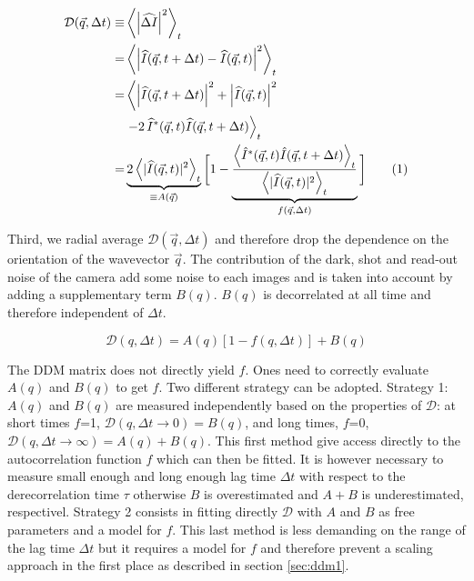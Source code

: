 \documentclass[prb,twocolumn,amsmath,amssymb]{revtex4-1}
\newcommand{\tgn}[1]{{\color{blue}#1}} %
\begin{document}
{%
\begin{align*}
\mathcal{D}(\vec{q},\Delta t) \equiv& \left\langle \left|\widehat{\Delta I}\right|^2 \right\rangle_t\\
 =& \left\langle \left|\widehat{I}(\vec{q},t+\Delta t) - \widehat{I}(\vec{q},t)\right|^2 \right\rangle_t \\
=& \left\langle \left|\widehat{I}(\vec{q},t+ \Delta t)\right|^2 + \left|\widehat{I}(\vec{q},t)\right|^2\right. \\
&\left.- 2 \, \widehat{I}^*(\vec{q},t) \widehat{I}(\vec{q},t+\Delta t) \right\rangle_t\\
=& \underbrace{2\left\langle | \widehat{I}(\vec{q},t)|^2  \right\rangle_t}_{\equiv A(\vec{q})} \bigg[ 1-\underbrace{\frac{\left\langle \hat{I}^*(\vec{q}, t) \hat{I}(\vec{q}, t+\Delta t) \right\rangle_t}{\left\langle | \widehat{I}(\vec{q},t)|^2  \right\rangle_t }}_{f(\vec{q}, \Delta t)} \bigg]
\addtocounter{equation}{1}\tag{\theequation} \label{eq:DDM}
\end{align*}
}

\tgn{Third, we radial average $\mathcal{D}(\vec{q},\Delta t)$ and therefore drop the dependence on the orientation of the wavevector $\vec{q}$.} The contribution of the dark, shot and read-out noise\cite{Mignard2015,Joubert2011} of the camera add some noise to each images and is taken into account by adding a supplementary term $B(q)$. $B(q)$ is decorrelated  at all time and therefore independent of $\Delta t$.

\begin{equation}
\mathcal{D}(q,\Delta t) = A(q)\left[1-f(q, \Delta t)\right] + B(q)
\label{eq:D2f}
\end{equation}

The DDM matrix does not directly yield $f$. Ones need to correctly evaluate $A(q)$ and $B(q)$ to get $f$. Two different strategy can be adopted. Strategy 1: $A(q)$ and $B(q)$ are measured independently based on the properties of $\mathcal{D}$: at short times $f$=1, $\mathcal{D}(q,\Delta t\rightarrow 0) = B(q)$, and long times, $f$=0, $\mathcal{D}(q,\Delta t\rightarrow \infty) = A(q)+B(q)$. This first method give access directly to the autocorrelation function $f$ which can then be fitted. It is however necessary to measure small enough and  long enough lag time $\Delta t$ with respect to the derecorrelation time $\tau$ otherwise $B$ is overestimated and $A+B$ is underestimated, respectivel. Strategy 2 consists in fitting directly $\mathcal{D}$ with $A$ and $B$ as free parameters and a model for $f$. This last method is less demanding on the range of the lag time $\Delta t$ but it requires a model for $f$ and therefore prevent a scaling approach in the first place as described in section \ref{sec:ddm1}.
\end{document}
